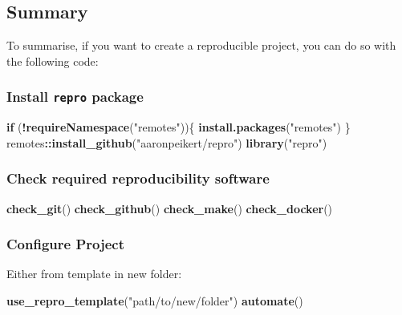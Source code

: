 \documentclass[12pt,a4paper,twoside]{article}
\newenvironment{Shaded}{\begin{snugshade}}{\end{snugshade}}
\newcommand{\ControlFlowTok}[1]{\textcolor[rgb]{0.13,0.29,0.53}{\textbf{#1}}}
\newcommand{\KeywordTok}[1]{\textcolor[rgb]{0.13,0.29,0.53}{\textbf{#1}}}
\newcommand{\NormalTok}[1]{#1}
\newcommand{\OperatorTok}[1]{\textcolor[rgb]{0.81,0.36,0.00}{\textbf{#1}}}
\newcommand{\StringTok}[1]{\textcolor[rgb]{0.31,0.60,0.02}{#1}}
\begin{document}
\hypertarget{summary}{%
\subsection{Summary}\label{summary}}

To summarise, if you want to create a reproducible project, you can do so with the following code:

\hypertarget{install-repro-package}{%
\subsubsection{\texorpdfstring{Install \texttt{repro} package}{Install repro package}}\label{install-repro-package}}

\begin{Shaded}
\begin{Highlighting}[]
\ControlFlowTok{if}\NormalTok{ (}\OperatorTok{!}\KeywordTok{requireNamespace}\NormalTok{(}\StringTok{"remotes"}\NormalTok{))\{}
  \KeywordTok{install.packages}\NormalTok{(}\StringTok{"remotes"}\NormalTok{)}
\NormalTok{\}}
\NormalTok{remotes}\OperatorTok{::}\KeywordTok{install_github}\NormalTok{(}\StringTok{"aaronpeikert/repro"}\NormalTok{)}
\KeywordTok{library}\NormalTok{(}\StringTok{"repro"}\NormalTok{)}
\end{Highlighting}
\end{Shaded}

\hypertarget{check-required-reproducibility-software}{%
\subsubsection{Check required reproducibility software}\label{check-required-reproducibility-software}}

\begin{Shaded}
\begin{Highlighting}[]
\KeywordTok{check_git}\NormalTok{()}
\KeywordTok{check_github}\NormalTok{()}
\KeywordTok{check_make}\NormalTok{()}
\KeywordTok{check_docker}\NormalTok{()}
\end{Highlighting}
\end{Shaded}

\hypertarget{configure-project}{%
\subsubsection{Configure Project}\label{configure-project}}

Either from template in new folder:

\begin{Shaded}
\begin{Highlighting}[]
\KeywordTok{use_repro_template}\NormalTok{(}\StringTok{"path/to/new/folder"}\NormalTok{)}
\KeywordTok{automate}\NormalTok{()}
\end{Highlighting}
\end{Shaded}
\end{document}
